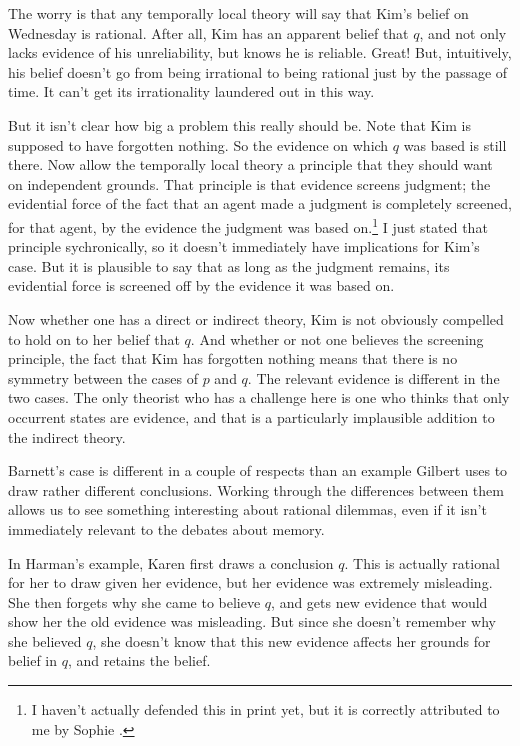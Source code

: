 The worry is that any temporally local theory will say that Kim's belief on Wednesday is rational. After all, Kim has an apparent belief that $q$, and not only lacks evidence of his unreliability, but knows he is reliable. Great! But, intuitively, his belief doesn't go from being irrational to being rational just by the passage of time. It can't get its irrationality laundered out in this way.

But it isn't clear how big a problem this really should be. Note that Kim is supposed to have forgotten nothing. So the evidence on which $q$ was based is still there. Now allow the temporally local theory a principle that they should want on independent grounds. That principle is that evidence screens judgment; the evidential force of the fact that an agent made a judgment is completely screened, for that agent, by the evidence the judgment was based on.\footnote{I haven't actually defended this in print yet, but it is correctly attributed to me by Sophie  \citet[25]{Horowitz2013}.} I just stated that principle sychronically, so it doesn't immediately have implications for Kim's case. But it is plausible to say that as long as the judgment remains, its evidential force is screened off by the evidence it was based on.

Now whether one has a direct or indirect theory, Kim is not obviously compelled to hold on to her belief that $q$. And whether or not one believes the screening principle, the fact that Kim has forgotten nothing means that there is no symmetry between the cases of $p$ and $q$. The relevant evidence is different in the two cases. The only theorist who has a challenge here is one who thinks that only occurrent states are evidence, and that is a particularly implausible addition to the indirect theory.

Barnett's case is different in a couple of respects than an example Gilbert  \citet[Ch. 4]{Harman1986} uses to draw rather different conclusions. Working through the differences between them allows us to see something interesting about rational dilemmas, even if it isn't immediately relevant to the debates about memory. 

In Harman's example, Karen first draws a conclusion $q$. This is actually rational for her to draw given her evidence, but her evidence was extremely misleading. She then forgets why she came to believe $q$, and gets new evidence that would show her the old evidence was misleading. But since she doesn't remember why she believed $q$, she doesn't know that this new evidence affects her grounds for belief in $q$, and retains the belief.

